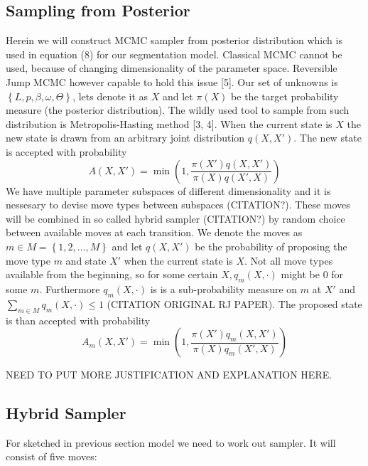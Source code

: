 \documentclass[journal]{IEEEtran}
\begin{document}
\subsection{Sampling from Posterior}
Herein we will construct MCMC sampler from posterior distribution which is used in equation (8) for our segmentation model. Classical MCMC cannot be used, because of changing dimensionality of the parameter space. Reversible Jump MCMC however capable to hold this issue [5]. Our set of unknowns is $\left\{L,p,\beta,\omega,\Theta\right\}$, lets denote it as $X$ and let $\pi\left(X\right)$ be the target probability measure (the posterior distribution). The wildly used tool to sample from such distribution is Metropolis-Hasting method [3, 4]. When the current state is $X$ the new state is drawn from an arbitrary joint distribution $q\left(X,X'\right)$. The new state is accepted with probability 
\begin{equation}
A(X,X') = \min\left(1,
\frac{\pi\left(X'\right)q\left(X,X'\right)}
{\pi\left(X\right)q\left(X',X\right)}\right)
\end{equation}
We have multiple parameter subspaces of different dimensionality and it is nessesary to devise move types between subspaces (CITATION?). These moves will be combined in so called hybrid sampler (CITATION?) by random choice between available moves at each transition. We denote the moves as $m \in M = \left\{1,2,...,M\right\}$ and let $q\left(X,X'\right)$ be the probability of proposing the move type $m$ and state $X'$ when the current state is $X$. Not all move types available from the beginning, so for some certain $X, q_{m}\left(X,\cdot\right)$ might be $0$ for some $m$. Furthermore $ q_{m}\left(X,\cdot\right)$ is is a sub-probability measure on $m$ at $X'$ and $\sum\limits_{m \in M} q_{m}\left(X,\cdot\right) \leq 1$ (CITATION ORIGINAL RJ PAPER). The proposed state is than accepted with probability 
\begin{equation}
A_{m}(X,X') = \min\left(1,
\frac{\pi\left(X'\right)q_{m}\left(X,X'\right)}
{\pi\left(X\right)q_{m}\left(X',X\right)}\right)
\end{equation}

NEED TO PUT MORE JUSTIFICATION AND EXPLANATION HERE.

\subsection{Hybrid Sampler}
For sketched in previous section model we need to work out sampler. It will consist of five moves:
\end{document}

